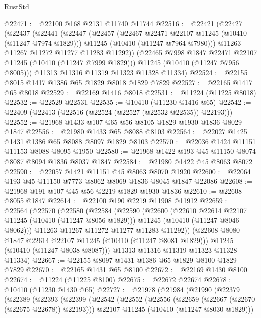 \begin{lexlean}{RustStd}
\begin{coremodule}
@22471 := @22100 @168 @2131 @11740 @11744
@22516 := @22421
    (@22427
      (@22437
        (@22441
          (@22447
            (@22457
              (@22467 @22471 @22107 @11245 (@10410 (@11247 @7974 @1829)))
              @11245
              (@10410 (@11247 @7964 @7980)))
            @11263
            @11267
            @11272
            @11277
            @11283
            @11292))
        (@22465 @7998 @1847 @22471 @22107 @11245 (@10410 (@11247 @7999 @1829)))
        @11245
        (@10410 (@11247 @7956 @8005)))
      @11313
      @11316
      @11319
      @11323
      @11328
      @11334)
@22524 := @22155 @8015 @1417 @1386 @65 @1829 @8018 @1829 @7829
@22527 := @22165 @1417 @65 @8018
@22529 := @22169 @1416 @8018
@22531 := @11224 (@11225 @8018)
@22532 := @22529 @22531
@22535 := @10410 (@11230 @1416 @65)
@22542 := @22409 (@22413 (@22516 (@22524 (@22527 (@22532 @22535)) @22193)))
@22552 := @21968 @1433 @107 @65 @56 @8105 @1829 @1930 @1836 @8029 @1847
@22556 := @21980 @1433 @65 @8088 @8103
@22564 := @22027 @1425 @1431 @1386 @65 @8088 @8097 @1829 @8103
@22570 := @22036 @1424 @11151 @11153 @8088 @8095 @1950
@22580 := @21968 @1422 @193 @45 @11150 @8074 @8087 @8094 @1836 @8037 @1847
@22584 := @21980 @1422 @45 @8063 @8072
@22590 := @22057 @1421 @11151 @45 @8063 @8070 @1920
@22600 := @22064 @193 @45 @11150 @7773 @8062 @8069 @1836 @8045 @1847 @22086
@22608 := @21968 @191 @107 @45 @56 @2219 @1829 @1930 @1836
@22610 := @22608 @8055 @1847
@22614 := @22100 @190 @2219 @11908 @11912
@22659 := @22564
    (@22570
      (@22580
        (@22584
          (@22590
            (@22600
              (@22610 @22614 @22107 @11245 (@10410 (@11247 @8056 @1829)))
              @11245
              (@10410 (@11247 @8046 @8062)))
            @11263
            @11267
            @11272
            @11277
            @11283
            @11292))
        (@22608 @8080 @1847 @22614 @22107 @11245 (@10410 (@11247 @8081 @1829)))
        @11245
        (@10410 (@11247 @8038 @8087)))
      @11313
      @11316
      @11319
      @11323
      @11328
      @11334)
@22667 := @22155 @8097 @1431 @1386 @65 @1829 @8100 @1829 @7829
@22670 := @22165 @1431 @65 @8100
@22672 := @22169 @1430 @8100
@22674 := @11224 (@11225 @8100)
@22675 := @22672 @22674
@22678 := @10410 (@11230 @1430 @65)
@22727 := @21978
    (@21984
      (@21990
        (@22379
          (@22389
            (@22393
              (@22399
                (@22542
                  (@22552
                    (@22556 (@22659 (@22667 (@22670 (@22675 @22678)) @22193)))
                    @22107
                    @11245
                    (@10410 (@11247 @8030 @1829)))

\end{coremodule}
\end{lexlean}
